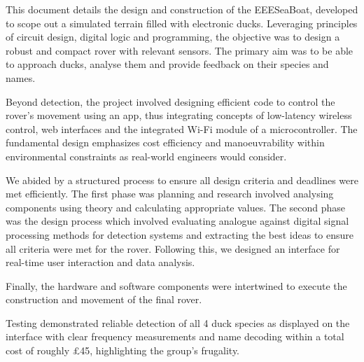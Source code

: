 This document details the design and construction of the EEESeaBoat, developed to scope out a simulated terrain filled with electronic ducks. Leveraging principles of circuit design, digital logic and programming, the objective was to design a robust and compact rover with relevant sensors. The primary aim was to be able to approach ducks, analyse them and provide feedback on their species and names.

Beyond detection, the project involved designing efficient code to control the rover's movement using an app, thus integrating concepts of low-latency wireless control, web interfaces and the integrated Wi-Fi module of a microcontroller. The fundamental design emphasizes cost efficiency and manoeuvrability within environmental constraints as real-world engineers would consider.

We abided by a structured process to ensure all design criteria and deadlines were met efficiently. The first phase was planning and research involved analysing components using theory and calculating appropriate values. The second phase was the design process which involved evaluating analogue against digital signal processing methods for detection systems and extracting the best ideas to ensure all criteria were met for the rover. Following this, we designed an interface for real-time user interaction and data analysis.

Finally, the hardware and software components were intertwined to execute the construction and movement of the final rover.

Testing demonstrated reliable detection of all 4 duck species as displayed on the interface with clear frequency measurements and name decoding within a total cost of roughly £45, highlighting the group's frugality.